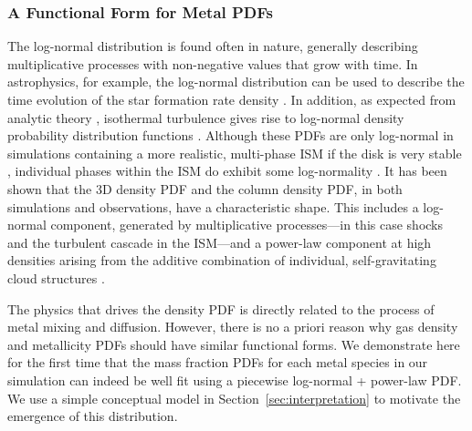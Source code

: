 \documentclass[twocolumn]{aastex61}
\begin{document}
\subsubsection{A Functional Form for Metal PDFs}
\label{sec:log-normal}

The log-normal distribution is found often in nature, generally describing 
    multiplicative
processes with non-negative values that grow with time. In astrophysics, for example, the log-normal distribution can be used to describe the time evolution of the star formation rate density \citep[see ][]{Gladders2013,Abramson2016,Diemer2017}. In addition, as expected from analytic theory \citep{Vazquez-Semadeni1994}, isothermal turbulence gives rise to log-normal density probability distribution functions \citep[PDFs;][]{Padoan1997, Passot1998, Ostriker1999,PadoanNordlund2002,KrumholzMcKee2005,Federrath2008}. Although these PDFs are only log-normal in simulations containing a more realistic, multi-phase ISM \citep{Scalo1998} if the disk is very stable \citep{WadaNorman2007}, individual phases within the ISM do exhibit some log-normality \citep{Tasker2009, Tasker2011,Joung2009,PriceFederrathBrunt2011, HopkinsQuataertMurray2012}. It has been shown that the 3D density PDF and the column density PDF, in both simulations and observations, have a characteristic shape. This includes a log-normal component, generated by multiplicative processes---in this case shocks and the turbulent cascade in the ISM---and a power-law component at high densities arising from the additive combination of individual, self-gravitating cloud structures \citep{Vazquez-Semadeni1994,Burkhart2009, FederrathKlessen2013, Collins2012, Myers2015, Burkhart2017, Chen2017}.

The physics that drives the density PDF is directly related to the process of metal mixing and diffusion. However, there is no a priori reason why gas density and metallicity PDFs should have similar functional forms. We demonstrate here for the first time that the mass fraction PDFs for each metal species in our simulation can indeed be well fit using a piecewise log-normal + power-law PDF. We use a simple conceptual model in Section~\ref{sec:interpretation} to motivate the emergence of this distribution.
\end{document}
